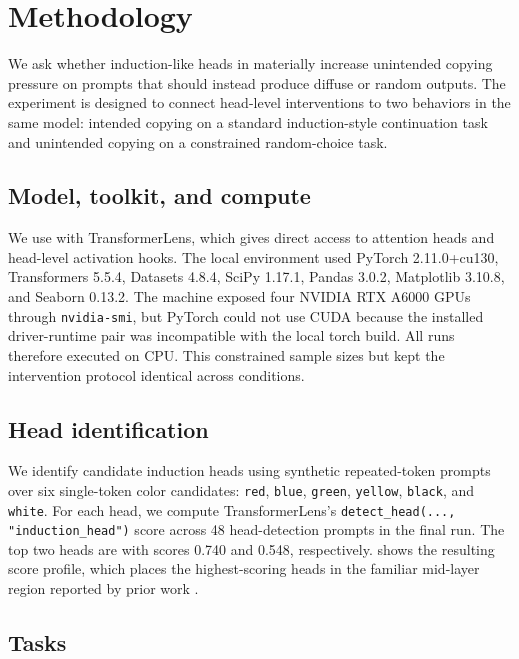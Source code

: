 \section{Methodology}
\label{sec:methodology}

 We ask whether induction-like heads in \gptsmall materially increase unintended copying pressure on prompts that should instead produce diffuse or random outputs. The experiment is designed to connect head-level interventions to two behaviors in the same model: intended copying on a standard induction-style continuation task and unintended copying on a constrained random-choice task.

\subsection{Model, toolkit, and compute}
\label{sec:model-setup}

We use \gptsmall with TransformerLens, which gives direct access to attention heads and head-level activation hooks. The local environment used PyTorch 2.11.0+cu130, Transformers 5.5.4, Datasets 4.8.4, SciPy 1.17.1, Pandas 3.0.2, Matplotlib 3.10.8, and Seaborn 0.13.2. The machine exposed four NVIDIA RTX A6000 GPUs through \texttt{nvidia-smi}, but PyTorch could not use CUDA because the installed driver-runtime pair was incompatible with the local torch build. All runs therefore executed on CPU. This constrained sample sizes but kept the intervention protocol identical across conditions.

\subsection{Head identification}
\label{sec:head-identification}

We identify candidate induction heads using synthetic repeated-token prompts over six single-token color candidates: \texttt{red}, \texttt{blue}, \texttt{green}, \texttt{yellow}, \texttt{black}, and \texttt{white}. For each head, we compute TransformerLens's \texttt{detect\_head(..., "induction\_head")} score across 48 head-detection prompts in the final run. The top two heads are \headpair with scores 0.740 and 0.548, respectively.  shows the resulting score profile, which places the highest-scoring heads in the familiar mid-layer region reported by prior work \cite{olsson2022induction, crosbie2024induction}.

\subsection{Tasks}
\label{sec:tasks}

